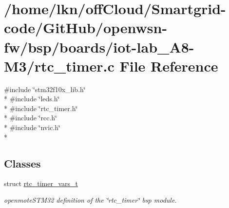 \hypertarget{iot-lab___a8-_m3_2rtc__timer_8c}{}\section{/home/lkn/off\+Cloud/\+Smartgrid-\/code/\+Git\+Hub/openwsn-\/fw/bsp/boards/iot-\/lab\+\_\+\+A8-\/\+M3/rtc\+\_\+timer.c File Reference}
\label{iot-lab___a8-_m3_2rtc__timer_8c}
{\ttfamily \#include \char`\"{}stm32f10x\+\_\+lib.\+h\char`\"{}}\\*
{\ttfamily \#include \char`\"{}leds.\+h\char`\"{}}\\*
{\ttfamily \#include \char`\"{}rtc\+\_\+timer.\+h\char`\"{}}\\*
{\ttfamily \#include \char`\"{}rcc.\+h\char`\"{}}\\*
{\ttfamily \#include \char`\"{}nvic.\+h\char`\"{}}\\*
\subsection*{Classes}
\begin{DoxyCompactItemize}
\item 
struct \hyperlink{structrtc__timer__vars__t}{rtc\+\_\+timer\+\_\+vars\+\_\+t}
\begin{DoxyCompactList}\small\item\em openmote\+S\+T\+M32 definition of the \char`\"{}rtc\+\_\+timer\char`\"{} bsp module. \end{DoxyCompactList}\end{DoxyCompactItemize}
